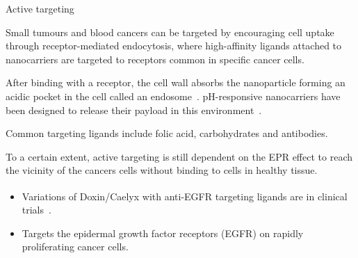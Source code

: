 \documentclass[final]{beamer}
\begin{document}
\begin{frame}[plain]
\begin{columns}[t,onlytextwidth]
\begin{block}{Active targeting\strut}
        Small tumours and blood cancers can be targeted by encouraging cell uptake through \alert{receptor-mediated endocytosis}, where high-affinity \alert{ligands attached to nanocarriers} are  \alert{targeted to receptors} common in specific cancer cells.

        After binding with a receptor, the \alert{cell wall absorbs the nanoparticle} forming an acidic pocket in the cell called an \alert{endosome}~\cite{gerweck1996cellular}. pH-responsive nanocarriers have been designed to release their payload in this environment~\cite{sun2014engineered}.

        Common targeting ligands include \alert{folic acid}, \alert{carbohydrates} and \alert{antibodies}.

        To a certain extent, active targeting is still dependent on the \alert{EPR effect} to reach the vicinity of the cancers cells without binding to cells in healthy tissue.

        \vspace{4ex}
        \begin{example}
          \begin{itemize}
            \item Variations of \alert{Doxin\textsuperscript{\textregistered}/Caelyx\textsuperscript{\textregistered}} with anti-EGFR targeting ligands are in clinical trials~\cite{mamot2012tolerability}.

            \item Targets the epidermal growth factor receptors (EGFR) on rapidly proliferating cancer cells.

          \end{itemize}
        \end{example}
      \end{block}

  \end{columns}

  \vfill
  \begin{multicols}{3}
    \printbibliography
  \end{multicols}
\end{frame}
\end{document}
